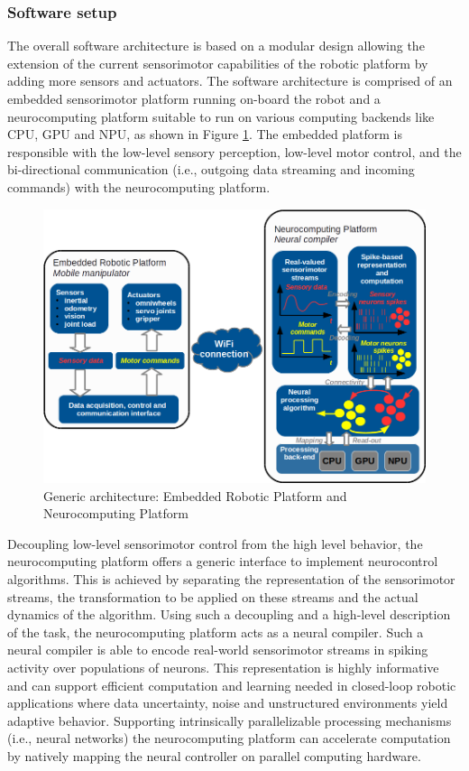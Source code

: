 \subsubsection{Software setup}%
\label{ssubsec:software_setup}

The overall software architecture is based on a modular design allowing the extension of the current sensorimotor capabilities of the robotic platform by adding more sensors and actuators. 
The software architecture is comprised of an embedded sensorimotor platform running on-board the robot and a neurocomputing platform suitable to run on various computing backends like \ac{CPU}, \ac{GPU} and \ac{NPU}, as shown in Figure \ref{fig:neurocomputing_platform}. 
The embedded platform is responsible with the low-level sensory perception, low-level motor control, and the bi-directional communication (i.e., outgoing data streaming and incoming commands) with the neurocomputing platform. 
\begin{figure}[t]
    \centering
    \includegraphics[width=0.8\linewidth]{imgs/neurocomputing_platform.png}
    \caption{Generic architecture: Embedded Robotic Platform and Neurocomputing Platform}
    \label{fig:neurocomputing_platform}
\end{figure}
Decoupling low-level sensorimotor control from the high level behavior, the neurocomputing platform offers a generic interface to implement neurocontrol algorithms. 
This is achieved by separating the representation of the sensorimotor streams, the transformation to be applied on these streams and the actual dynamics of the algorithm. 
Using such a decoupling and a high-level description of the task, the neurocomputing platform acts as a neural compiler. 
Such a neural compiler is able to encode real-world sensorimotor streams in spiking activity over populations of neurons. 
This representation is highly informative and can support efficient computation and learning needed in closed-loop robotic applications where data uncertainty, noise and unstructured environments yield adaptive behavior. 
Supporting intrinsically parallelizable processing mechanisms (i.e., neural networks) the neurocomputing platform can accelerate computation by natively mapping the neural controller on parallel computing hardware.

